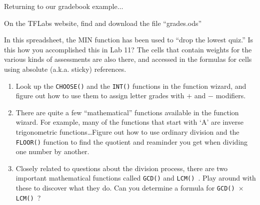 Returning to our gradebook example$\ldots$

On the TFLabs website, find and download the file ``grades.ods''

In this spreadsheet, the MIN function has been used to ``drop the lowest quiz.''  Is this how you accomplished this in Lab 11?  The cells that contain weights for the various kinds of assessments are also there, and accessed in the formulas for cells using absolute (a.k.a. sticky) references.

\begin{enumerate}

\item Look up the {\tt CHOOSE()} and the {\tt INT()} functions in the function wizard, and figure out how to use them to assign letter grades with $+$ and $-$ modifiers.

\vspace{1in}

\item There are quite a few ``mathematical'' functions available in the function wizard.  For example, many of the functions that start with `A' are inverse trigonometric functions\dots  Figure out how to use ordinary division and the {\tt FLOOR()} function to find the quotient and reaminder you get when dividing one number by another.

\vspace{1in} 

\item Closely related to questions about the division process, there are two important mathematical functions called {\tt GCD()} and {\tt LCM() }.  Play around with these to discover what they do.  Can you determine a formula for {\tt GCD() $\times$ LCM() }?

\vfill

\end{enumerate}
